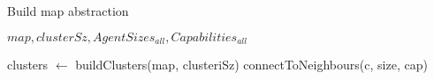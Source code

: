 \begin{algorithm}
\caption{Build map abstraction}
\label{aha-alg:buildabstraction}
\begin{algorithmic}
\REQUIRE $map, clusterSz, AgentSizes_{all}, Capabilities_{all}$

	\STATE clusters $\leftarrow$ buildClusters(map, clusteriSz)
				\STATE connectToNeighbours(c, size, cap)
			\ENDFOR
		\ENDFOR
	\ENDFOR
\end{algorithmic}
\end{algorithm}

